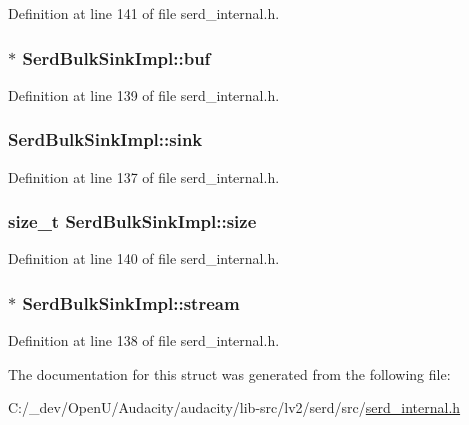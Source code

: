 Definition at line 141 of file serd\+\_\+internal.\+h.

\subsubsection[{\texorpdfstring{buf}{buf}}]{$\ast$ Serd\+Bulk\+Sink\+Impl\+::buf}\hypertarget{struct_serd_bulk_sink_impl_a9d8d208c8cd0bb28a0f58854a4d7e859}{}\label{struct_serd_bulk_sink_impl_a9d8d208c8cd0bb28a0f58854a4d7e859}


Definition at line 139 of file serd\+\_\+internal.\+h.

\subsubsection[{\texorpdfstring{sink}{sink}}]{ Serd\+Bulk\+Sink\+Impl\+::sink}\hypertarget{struct_serd_bulk_sink_impl_a264743ac6266d7217d6a23c7452ea035}{}\label{struct_serd_bulk_sink_impl_a264743ac6266d7217d6a23c7452ea035}


Definition at line 137 of file serd\+\_\+internal.\+h.

\subsubsection[{\texorpdfstring{size}{size}}]{\setlength{\rightskip}{0pt plus 5cm}size\+\_\+t Serd\+Bulk\+Sink\+Impl\+::size}\hypertarget{struct_serd_bulk_sink_impl_acc59a940f7c2243de2c951d63d19bfc5}{}\label{struct_serd_bulk_sink_impl_acc59a940f7c2243de2c951d63d19bfc5}


Definition at line 140 of file serd\+\_\+internal.\+h.

\subsubsection[{\texorpdfstring{stream}{stream}}]{$\ast$ Serd\+Bulk\+Sink\+Impl\+::stream}\hypertarget{struct_serd_bulk_sink_impl_abeac79c8db3faeb5bf9cc8f2fd0dfad7}{}\label{struct_serd_bulk_sink_impl_abeac79c8db3faeb5bf9cc8f2fd0dfad7}


Definition at line 138 of file serd\+\_\+internal.\+h.



The documentation for this struct was generated from the following file\+:\begin{DoxyCompactItemize}
\item 
C\+:/\+\_\+dev/\+Open\+U/\+Audacity/audacity/lib-\/src/lv2/serd/src/\hyperlink{serd__internal_8h}{serd\+\_\+internal.\+h}\end{DoxyCompactItemize}
